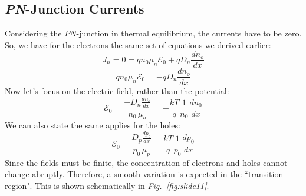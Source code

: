 \subsection{\emph{PN}-Junction Currents}
Considering the $PN$-junction in thermal equilibrium,  the currents have to be zero.  So, we have for the electrons the same set of equations we derived earlier:
    \begin{equation} 
        J_n = 0 = q{n_0}{\mu _n}{\mathcal{E}_0} + q{D_n}\frac{dn_o}{dx}
    \end{equation}
    \begin{equation} 
        q{n_0}{\mu _n}{\mathcal{E}_0} =  - q{D_n}\frac{dn_o}{dx}
    \end{equation}
Now let's focus on the electric field, rather than the potential:
    \begin{equation} 
        \mathcal{E}_0 = \frac{-D_n\frac{dn_o}{dx}} {n_0\,\mu_n} = -\frac{kT}{q}\frac{1}{n_0}\frac{dn_0}{dx} 
    \end{equation}
We can also state the same applies for the holes:
    \begin{equation} 
        \mathcal{E}_0 = \frac{D_p\frac{dp_o}{dx}} {p_0\,\mu_p} = \frac{kT}{q}\frac{1}{p_0}\frac{dp_0}{dx} 
    \end{equation}
Since the fields must be finite, the concentration of electrons and holes cannot change abruptly. Therefore, a smooth variation is expected in the ``transition region".  This is shown schematically in \emph{Fig.~\ref{fig:slide11}}.
\newpage
